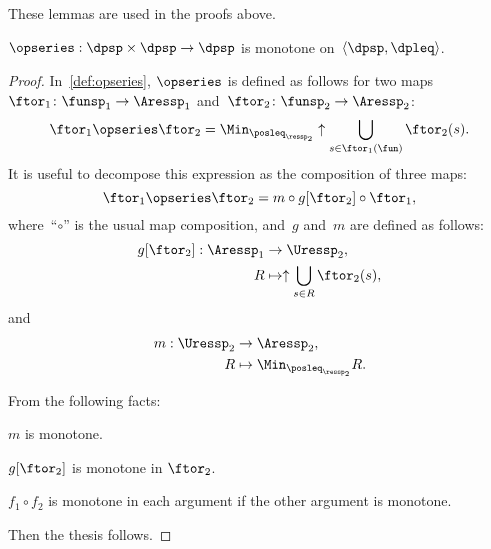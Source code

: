 These lemmas are used in the proofs above.
\begin{lemma}
    \label{lem:series-monotone}$\opseries:\dpsp\times\dpsp\rightarrow\dpsp$
    is monotone on~$\langle\dpsp,\dpleq\rangle$.
\end{lemma}
\begin{proof}
    In~\cref{def:opseries}, $\opseries$ is defined as follows
    for two maps~$\ftor_{1}\colon\funsp_{1}\rightarrow\Aressp_{1}$ and~$\ftor_{2}\colon\funsp_{2}\rightarrow\Aressp_{2}$:
    \[
        {\displaystyle \ftor_{1}\opseries\ftor_{2}=\Min_{\posleq_{\ressp_{2}}}\uparrow\bigcup_{s\in\ftor_{1}(\fun)}\ftor_{2}(s)}.
    \]
    It is useful to decompose this expression as the composition of three
    maps:
    \[
        \ftor_{1}\opseries\ftor_{2}=m\circ g[\ftor_{2}]\circ\ftor_{1},
    \]
    where~``$\circ$'' is the usual map composition, and~$g$ and~$m$
    are defined as follows:
    \begin{align*}
        g[\ftor_{2}]:\Aressp_{1} & \rightarrow\Uressp_{2},                      \\
        R                        & \mapsto\uparrow\bigcup_{s\in R}\ftor_{2}(s),
    \end{align*}
    and
    \begin{align*}
        m:\Uressp_{2} & \to \Aressp_{2},                   \\
        R             & \mapsto\Min_{\posleq_{\ressp_{2}}}
        R.
    \end{align*}

    From the following facts:
    \begin{compactitem}
        \item $m$ is monotone.
        \item $g[\ftor_{2}]$ is monotone in $\ftor_{2}$.
        \item $f_{1}\circ f_{2}$ is monotone in each argument if the other argument
              is monotone.
    \end{compactitem}
    Then the thesis follows.
\end{proof}

